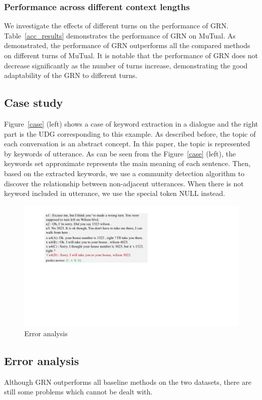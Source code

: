 \documentclass[letterpaper]{article} %
\begin{document}
\subsubsection{Performance across different context lengths}
We investigate the effects of different turns on the performance of GRN. Table~\ref{acc_results} demonstrates the performance of GRN on MuTual. As demonstrated, the performance of GRN outperforms all the compared methods on different turns of MuTual. It is notable that the performance of GRN does not decrease significantly as the number of turns increase, demonstrating the good adaptability of the GRN to different turns.
\subsection{Case study}
Figure~\ref{case} (left) shows a case of keyword extraction in a dialogue and the right part is the UDG corresponding to this example. As described before, the topic of each conversation is an abstract concept. In this paper, the topic is represented by keywords of utterance. As can be seen from the Figure~\ref{case} (left), the keywords set approximate represents the main meaning of each sentence. Then, based on the extracted keywords, we use a community detection algorithm to discover the relationship between non-adjacent utterances. When there is not keyword included in utterance, we use the special token NULL instead.
\begin{figure}[t]
\centering
\includegraphics[width=1\columnwidth]{error}
\caption{Error analysis}
\label{error}
\end{figure}
\subsection{Error analysis}
Although GRN outperforms all baseline methods on the two datasets, there are still some problems which cannot be dealt with.
\end{document}
